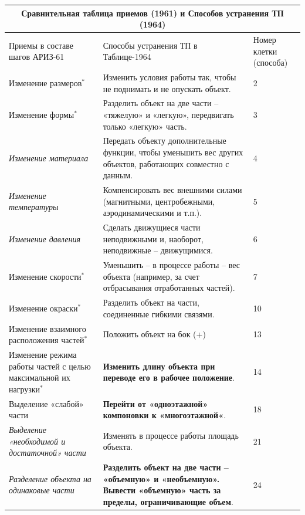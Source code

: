 \documentclass[11pt,a4paper]{article}
\begin{document}
\begin{center}
  \begin{tabular}{|p{}|p{}|p{}|}\hline
    \multicolumn{3}{|c|}{Сравнительная таблица приемов (1961) и Способов
      устранения ТП (1964)} \\\hline
    Приемы в составе шагов АРИЗ-61& Способы устранения ТП в Таблице-1964&
Номер клетки (способа)\\\hline
Изменение размеров$^\ast$ & Изменить условия работы так, чтобы не поднимать и не
опускать объект.& 2\\\hline
Изменение формы$^\ast$& Разделить объект на две части -- «тяжелую» и «легкую»,
передвигать только «легкую» часть.& 3\\\hline
\emph{Изменение материала} & Передать объекту дополнительные функции, чтобы
уменьшить вес других объектов, работающих совместно с данным. & 4\\\hline
\emph{Изменение температуры} & Компенсировать вес внешними силами (магнитными,
центробежными, аэродинамическими и т.п.). & 5\\\hline
\emph{Изменение давления} & Сделать движущиеся части неподвижными и, наоборот,
неподвижные -- движущимися. & 6\\\hline
Изменение скорости$^\ast$  & Уменьшить -- в процессе работы -- вес объекта
(например, за счет отбрасывания отработанных частей). & 7\\\hline
Изменение окраски$^\ast$  & Разделить объект на части, соединенные гибкими
связями. & 10 \\\hline
Изменение взаимного расположения частей$^\ast$ & Положить объект на бок (+) & 
13\\\hline
Изменение режима работы частей с целью максимальной их нагрузки$^\ast$  &
\textbf{Изменить длину объекта при переводе его в рабочее положение}. &
14\\\hline 
Выделение «слабой» части  & \textbf{Перейти от «одноэтажной» компоновки к
«многоэтажной«}. & 18\\\hline
\emph{Выделение «необходимой и достаточной» части} & Изменять в процессе работы
площадь объекта. & 21\\\hline
\emph{Разделение объекта на одинаковые части} & \textbf{Разделить объект на
  две части -- «объемную» и «необъемную». Вывести «объемную» часть за пределы,
  ограничивающие объем}. & 24\\\hline
  \end{tabular}


\end{center}
\end{document}
